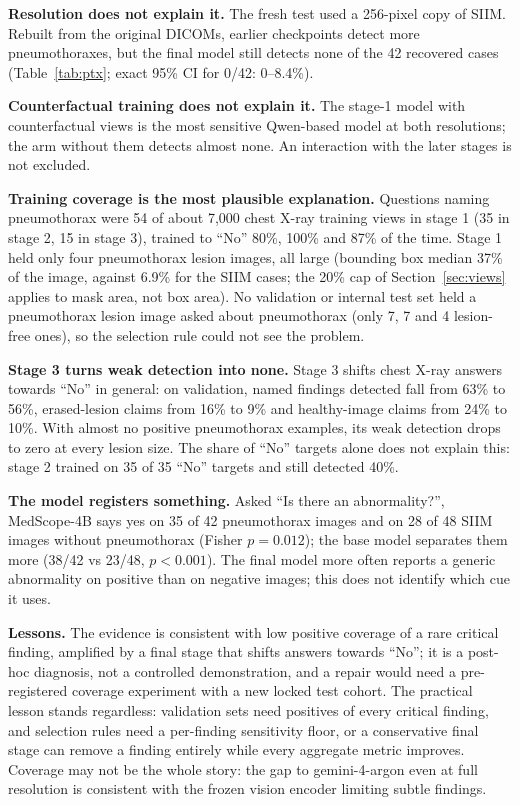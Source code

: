 \documentclass[11pt]{article}
\begin{document}
\textbf{Resolution does not explain it.} The fresh test used a 256-pixel copy of SIIM. Rebuilt from the original DICOMs, earlier checkpoints detect more pneumothoraxes, but the final model still detects none of the 42 recovered cases (Table~\ref{tab:ptx}; exact 95\% CI for 0/42: 0--8.4\%).

\textbf{Counterfactual training does not explain it.} The stage-1 model with counterfactual views is the most sensitive Qwen-based model at both resolutions; the arm without them detects almost none. An interaction with the later stages is not excluded.

\textbf{Training coverage is the most plausible explanation.} Questions naming pneumothorax were 54 of about 7,000 chest X-ray training views in stage 1 (35 in stage 2, 15 in stage 3), trained to ``No'' 80\%, 100\% and 87\% of the time. Stage 1 held only four pneumothorax lesion images, all large (bounding box median 37\% of the image, against 6.9\% for the SIIM cases; the 20\% cap of Section~\ref{sec:views} applies to mask area, not box area). No validation or internal test set held a pneumothorax lesion image asked about pneumothorax (only 7, 7 and 4 lesion-free ones), so the selection rule could not see the problem.

\textbf{Stage 3 turns weak detection into none.} Stage 3 shifts chest X-ray answers towards ``No'' in general: on validation, named findings detected fall from 63\% to 56\%, erased-lesion claims from 16\% to 9\% and healthy-image claims from 24\% to 10\%. With almost no positive pneumothorax examples, its weak detection drops to zero at every lesion size. The share of ``No'' targets alone does not explain this: stage 2 trained on 35 of 35 ``No'' targets and still detected 40\%.

\textbf{The model registers something.} Asked ``Is there an abnormality?'', MedScope-4B says yes on 35 of 42 pneumothorax images and on 28 of 48 SIIM images without pneumothorax (Fisher $p=0.012$); the base model separates them more (38/42 vs 23/48, $p<0.001$). The final model more often reports a generic abnormality on positive than on negative images; this does not identify which cue it uses.

\textbf{Lessons.} The evidence is consistent with low positive coverage of a rare critical finding, amplified by a final stage that shifts answers towards ``No''; it is a post-hoc diagnosis, not a controlled demonstration, and a repair would need a pre-registered coverage experiment with a new locked test cohort. The practical lesson stands regardless: validation sets need positives of every critical finding, and selection rules need a per-finding sensitivity floor, or a conservative final stage can remove a finding entirely while every aggregate metric improves. Coverage may not be the whole story: the gap to gemini-4-argon even at full resolution is consistent with the frozen vision encoder limiting subtle findings.
\end{document}
